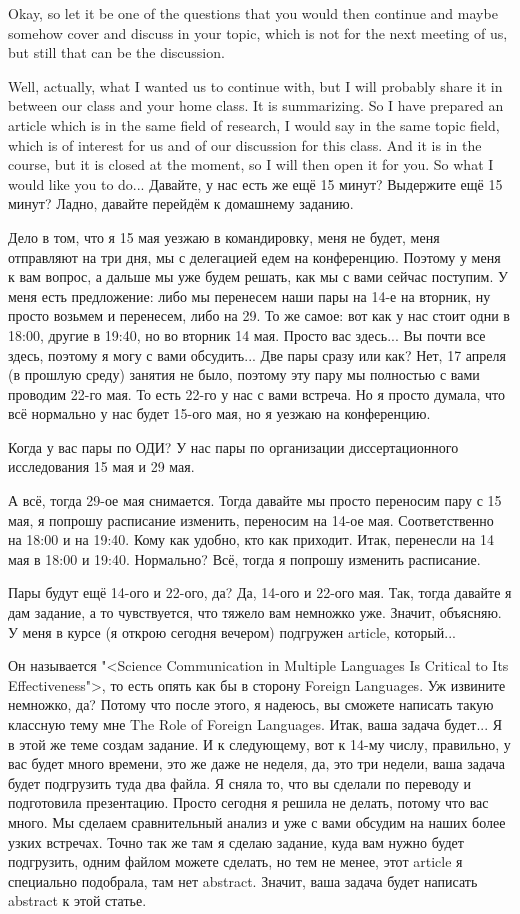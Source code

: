 \documentclass[main.tex]{subfiles}
\begin{document}
Okay, so let it be one of the questions that you would then continue and maybe somehow cover and discuss in your topic, which is not for the next meeting of us, but still that can be the discussion.

Well, actually, what I wanted us to continue with, but I will probably share it in between our class and your home class.
It is summarizing.
So I have prepared an article which is in the same field of research, I would say in the same topic field, which is of interest for us and of our discussion for this class.
And it is in the course, but it is closed at the moment, so I will then open it for you.
So what I would like you to do...
Давайте, у нас есть же ещё 15 минут?
Выдержите ещё 15 минут?
Ладно, давайте перейдём к домашнему заданию.

Дело в том, что я 15 мая уезжаю в командировку, меня не будет, меня отправляют на три дня, мы с делегацией едем на конференцию.
Поэтому у меня к вам вопрос, а дальше мы уже будем решать, как мы с вами сейчас поступим.
У меня есть предложение: либо мы перенесем наши пары на 14-е на вторник, ну просто возьмем и перенесем, либо на 29.
То же самое: вот как у нас стоит одни в 18:00, другие в 19:40, но во вторник 14 мая.
Просто вас здесь...
Вы почти все здесь, поэтому я могу с вами обсудить...
Две пары сразу или как?
Нет, 17 апреля (в прошлую среду) занятия не было, поэтому эту пару мы полностью с вами проводим 22-го мая.
То есть 22-го у нас с вами встреча.
Но я просто думала, что всё нормально у нас будет 15-ого мая, но я уезжаю на конференцию.

Когда у вас пары по ОДИ?
У нас пары по организации диссертационного исследования 15 мая и 29 мая.

А всё, тогда 29-ое мая снимается.
Тогда давайте мы просто переносим пару с 15 мая, я попрошу расписание изменить, переносим на 14-ое мая.
Соответственно на 18:00 и на 19:40.
Кому как удобно, кто как приходит.
Итак, перенесли на 14 мая в 18:00 и 19:40.
Нормально?
Всё, тогда я попрошу изменить расписание.

Пары будут ещё 14-ого и 22-ого, да?
Да, 14-ого и 22-ого мая.
Так, тогда давайте я дам задание, а то чувствуется, что тяжело вам немножко уже.
Значит, объясняю.
У меня в курсе (я открою сегодня вечером) подгружен article, который...

Он называется "<Science Communication in Multiple Languages Is Critical to Its Effectiveness">, то есть опять как бы в сторону Foreign Languages.
Уж извините немножко, да?
Потому что после этого, я надеюсь, вы сможете написать такую классную тему мне The Role of Foreign Languages.
Итак, ваша задача будет...
Я в этой же теме создам задание.
И к следующему, вот к 14-му числу, правильно, у вас будет много времени, это же даже не неделя, да, это три недели, ваша задача будет подгрузить туда два файла.
Я сняла то, что вы сделали по переводу и подготовила презентацию.
Просто сегодня я решила не делать, потому что вас много.
Мы сделаем сравнительный анализ и уже с вами обсудим на наших более узких встречах.
Точно так же там я сделаю задание, куда вам нужно будет подгрузить, одним файлом можете сделать, но тем не менее, этот article я специально подобрала, там нет abstract.
Значит, ваша задача будет написать abstract к этой статье.
\end{document}
